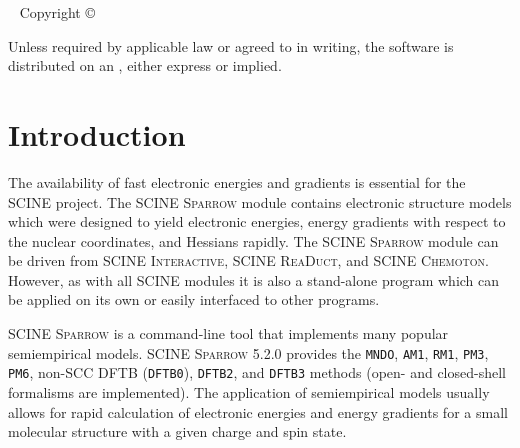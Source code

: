 \documentclass[]{tufte-book}
\title[SCINE Sparrow manual]{User Manual \vskip 0.5em {\setlength{\parindent}{0pt} \Huge SCINE Sparrow 5.2.0}}
\author[The SCINE Sparrow Developers]{The SCINE Sparrow Developers: \newline \noindent Francesco Bosia, Tamara Husch, Charlotte H.~M\"uller, Severin Polonius, Jan-Grimo Sobez, Miguel Steiner, Jan P.~Unsleber, Alain C.~Vaucher, Thomas Weymuth, and Markus Reiher}
\newcommand{\monthyear}{%
  \ifcase\month\or January\or February\or March\or April\or May\or June\or
  July\or August\or September\or October\or November\or
  December\fi\space\number\year
}
\begin{document}
\setlength{\parindent}{0pt}

\frontmatter


\maketitle


\newpage
\begin{fullwidth}
~\vfill
\thispagestyle{empty}
\setlength{\parindent}{0pt}
\setlength{\parskip}{\baselineskip}
Copyright \copyright\ \the\year\ \thanklessauthor


\par{}

\par Unless required by applicable law or agreed to in writing, the software 
is distributed on an , either express or implied. 

\end{fullwidth}

\tableofcontents




\mainmatter

\let\cleardoublepage\clearpage
\chapter{Introduction}

The availability of fast electronic energies and gradients is essential for the SCINE project. The SCINE \textsc{Sparrow} 
module contains electronic structure models which were designed to yield electronic energies, energy gradients with 
respect to the nuclear coordinates, and Hessians rapidly. The SCINE \textsc{Sparrow} module can be driven from SCINE 
\textsc{Interactive}, SCINE \textsc{ReaDuct}, and SCINE \textsc{Chemoton}. However, as with all SCINE modules it is also 
a stand-alone program which can be applied on its own or easily interfaced to other programs.

SCINE \textsc{Sparrow} is a command-line tool that implements many popular semiempirical models. SCINE \textsc{Sparrow} 5.2.0
provides the \texttt{MNDO}, \texttt{AM1}, \texttt{RM1}, \texttt{PM3}, \texttt{PM6}, non-SCC DFTB (\texttt{DFTB0}), \texttt{DFTB2}, and \texttt{DFTB3} methods 
(open- and closed-shell formalisms are implemented). 
The application of semiempirical models usually allows for rapid calculation of electronic energies and energy gradients 
for a small molecular structure with a given charge and spin state.
\end{document}
